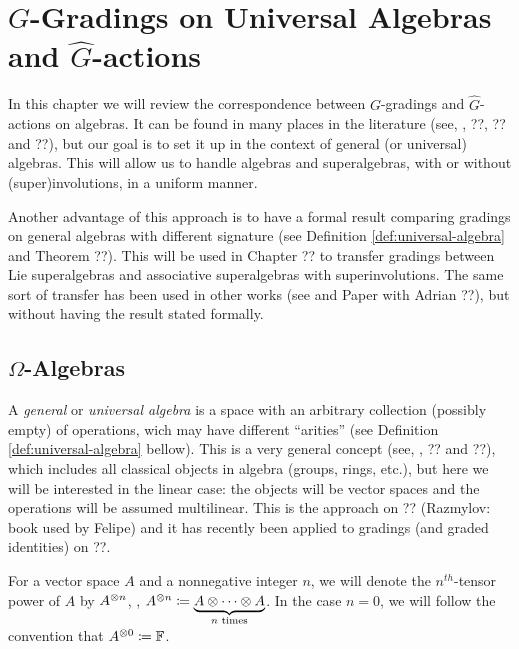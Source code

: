 \chapter{$G$-Gradings on Universal Algebras and $\widehat G$-actions}

In this chapter we will review the correspondence between $G$-gradings and $\widehat G$-actions on algebras. 
It can be found in many places in the literature (see, \eg, ??, ?? and ??), but our goal is to set it up in the context of general (or universal) algebras. 
This will allow us to handle algebras and superalgebras, with or without (super)involutions, in a uniform manner. 

Another advantage of this approach is to have a formal result comparing gradings on general algebras with different signature (see Definition \ref{def:universal-algebra} and Theorem ??). 
This will be used in Chapter ?? to transfer gradings between Lie superalgebras and associative superalgebras with superinvolutions. 
The same sort of transfer has been used in other works (see \cite{livromicha} and Paper with Adrian ??), but without having the result stated formally. 

\section{$\Omega$-Algebras}

A \emph{general} or \emph{universal algebra} is a space with an arbitrary collection (possibly empty) of operations, wich may have different ``arities'' (see Definition \ref{def:universal-algebra} bellow). 
This is a very general concept (see, \eg, ?? and ??), which includes all classical objects in algebra (groups, rings, etc.), but here we will be interested in the linear case: the objects will be vector spaces and the operations will be assumed multilinear.
This is the approach on ?? (Razmylov: book used by Felipe) and it has recently been applied to gradings (and graded identities) on ??. 

\begin{notation}
    For a vector space $A$ and a nonnegative integer $n$, we will denote the $n^{th}$-tensor power of $A$ by $A^{\otimes n}$, \ie,
    $A^{\otimes n} \coloneqq \underbrace{A\otimes\cdots\otimes A}_{n \text{ times}}$. 
    In the case $n = 0$, we will follow the convention that $A^{\otimes 0} \coloneqq \mathbb{F}$.
\end{notation}

